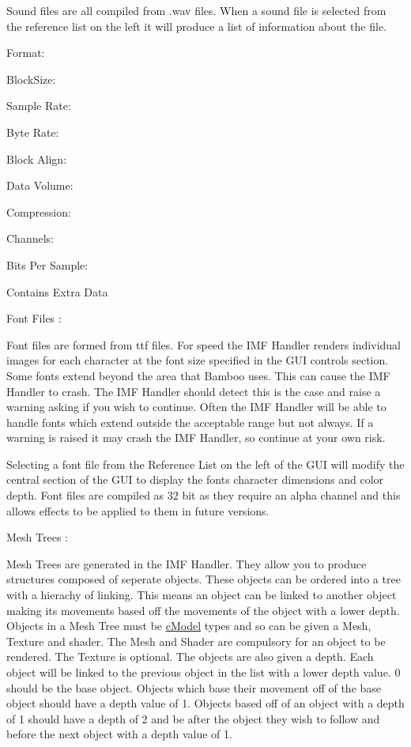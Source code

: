  Sound files are all compiled from .wav files. When a sound file is selected from the reference list on the left it will produce a list of information about the file.
\begin{DoxyItemize}
\item Format:
\item BlockSize:
\item Sample Rate:
\item Byte Rate:
\item Block Align:
\item Data Volume:
\item Compression:
\item Channels:
\item Bits Per Sample:
\item Contains Extra Data
\end{DoxyItemize}Font Files : \par
 Font files are formed from ttf files. For speed the IMF Handler renders individual images for each character at the font size specified in the GUI controls section. Some fonts extend beyond the area that Bamboo uses. This can cause the IMF Handler to crash. The IMF Handler should detect this is the case and raise a warning asking if you wish to continue. Often the IMF Handler will be able to handle fonts which extend outside the acceptable range but not always. If a warning is raised it may crash the IMF Handler, so continue at your own risk. \par
 Selecting a font file from the Reference List on the left of the GUI will modify the central section of the GUI to display the fonts character dimensions and color depth. Font files are compiled as 32 bit as they require an alpha channel and this allows effects to be applied to them in future versions. \par
 Mesh Trees : \par
 Mesh Trees are generated in the IMF Handler. They allow you to produce structures composed of seperate objects. These objects can be ordered into a tree with a hierachy of linking. This means an object can be linked to another object making its movements based off the movements of the object with a lower depth. Objects in a Mesh Tree must be \hyperlink{classc_model}{cModel} types and so can be given a Mesh, Texture and shader. The Mesh and Shader are compulsory for an object to be rendered. The Texture is optional. The objects are also given a depth. Each object will be linked to the previous object in the list with a lower depth value. 0 should be the base object. Objects which base their movement off of the base object should have a depth value of 1. Objects based off of an object with a depth of 1 should have a depth of 2 and be after the object they wish to follow and before the next object with a depth value of 1. \par

